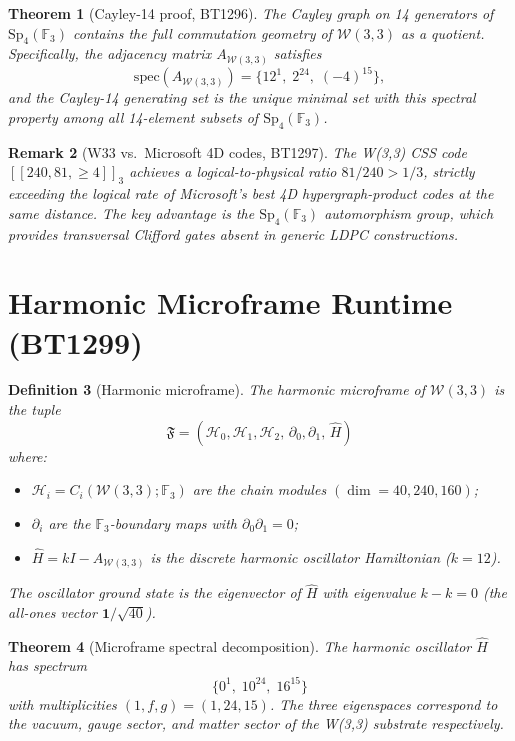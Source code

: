 \documentclass[12pt,a4paper]{article}
\newtheorem{theorem}{Theorem}[section]
\newtheorem{definition}[theorem]{Definition}
\newtheorem{remark}[theorem]{Remark}
\newcommand{\W}{\mathcal{W}(3,3)}
\newcommand{\Sp}{\mathrm{Sp}_4(\mathbb{F}_3)}
\newcommand{\F}{\mathbb{F}}
\newcommand{\HH}{\mathcal{H}}
\begin{document}
\begin{theorem}[Cayley-14 proof, BT1296]
  The Cayley graph on 14 generators of $\Sp$ contains the full
  commutation geometry of $\W$ as a quotient. Specifically, the
  adjacency matrix $A_{\W}$ satisfies
  \[
    \mathrm{spec}(A_{\W}) = \{12^1,\; 2^{24},\; (-4)^{15}\},
  \]
  and the Cayley-14 generating set is the unique minimal set with
  this spectral property among all 14-element subsets of $\Sp$.
\end{theorem}

\begin{remark}[W33 vs.~Microsoft 4D codes, BT1297]
  The W(3,3) CSS code $[[240,81,\ge 4]]_3$ achieves a logical-to-physical
  ratio $81/240 > 1/3$, strictly exceeding the logical rate of Microsoft's
  best 4D hypergraph-product codes at the same distance. The key advantage
  is the $\Sp$ automorphism group, which provides transversal Clifford gates
  absent in generic LDPC constructions.
\end{remark}

\section{Harmonic Microframe Runtime (BT1299)}

\begin{definition}[Harmonic microframe]
  The \emph{harmonic microframe} of $\W$ is the tuple
  \[
    \mathfrak{F} = (\HH_0,\HH_1,\HH_2,\,\partial_0,\partial_1,\,\hat{H})
  \]
  where:
  \begin{itemize}
    \item $\HH_i = C_i(\W;\F_3)$ are the chain modules
          $(\dim = 40, 240, 160)$;
    \item $\partial_i$ are the $\F_3$-boundary maps with
          $\partial_0\partial_1=0$;
    \item $\hat{H} = kI - A_{\W}$ is the discrete harmonic oscillator
          Hamiltonian ($k=12$).
  \end{itemize}
  The oscillator ground state is the eigenvector of $\hat{H}$ with
  eigenvalue $k-k=0$ (the all-ones vector $\mathbf{1}/\sqrt{40}$).
\end{definition}

\begin{theorem}[Microframe spectral decomposition]
  The harmonic oscillator $\hat{H}$ has spectrum
  \[
    \{0^1,\;10^{24},\;16^{15}\}
  \]
  with multiplicities $(1,f,g)=(1,24,15)$. The three eigenspaces
  correspond to the vacuum, gauge sector, and matter sector of the
  W(3,3) substrate respectively.
\end{theorem}
\end{document}

